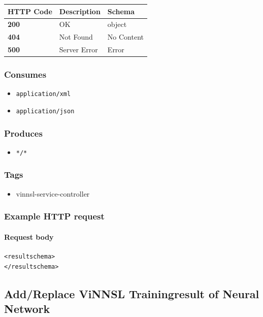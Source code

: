\begin{longtable}[]{@{}lll@{}}
\toprule
HTTP Code & Description & Schema\tabularnewline
\midrule
\endhead
\textbf{200} & OK & object\tabularnewline
\textbf{404} & Not Found & No Content\tabularnewline
\textbf{500} & Server Error & Error\tabularnewline
\bottomrule
\end{longtable}

\subsubsection{Consumes}\label{consumes-4}

\begin{itemize}
\tightlist
\item
  \texttt{application/xml}
\item
  \texttt{application/json}
\end{itemize}

\subsubsection{Produces}\label{produces-8}

\begin{itemize}
\tightlist
\item
  \texttt{*/*}
\end{itemize}

\subsubsection{Tags}\label{tags-8}

\begin{itemize}
\tightlist
\item
  vinnsl-service-controller
\end{itemize}

\subsubsection{Example HTTP request}\label{example-http-request-3}

\paragraph{Request body}\label{request-body-2}

\begin{verbatim}
<resultschema>
</resultschema>
\end{verbatim}

\subsection{Add/Replace ViNNSL Trainingresult of Neural
Network}\label{addreplace-vinnsl-trainingresult-of-neural-network}

